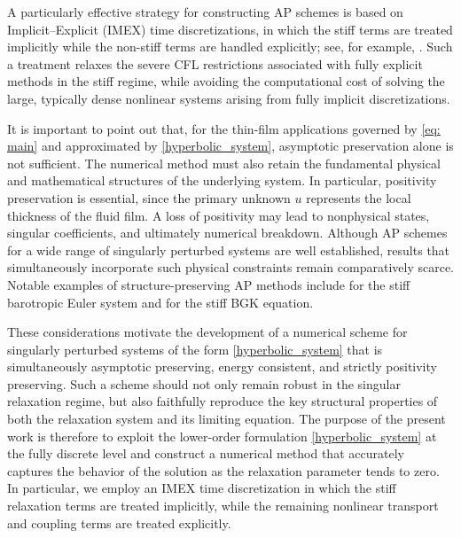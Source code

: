 \documentclass[11pt]{article}
\numberwithin{equation}{section}
\newtheorem{counter example}[theorem]{Counter Example}
\numberwithin{equation}{section}
\numberwithin{equation}{section}
\begin{document}
A particularly effective strategy for constructing AP schemes is based on Implicit--Explicit (IMEX) time discretizations, in which the stiff terms are treated implicitly while the non-stiff terms are handled explicitly; see, for example, \cite{dimarco2018second, BAL+14, BLY17, BRS18, CDK12, DT11, DP13, HJL12, Kle95, NBA+14}. Such a treatment relaxes the severe CFL restrictions associated with fully explicit methods in the stiff regime, while avoiding the computational cost of solving the large, typically dense nonlinear systems arising from fully implicit discretizations.

It is important to point out that, for the thin-film applications governed by \eqref{eq: main} and approximated by \eqref{hyperbolic_system}, asymptotic preservation alone is not sufficient. The numerical method must also retain the fundamental physical and mathematical structures of the underlying system. In particular, positivity preservation is essential, since the primary unknown $u$ represents the local thickness of the fluid film. A loss of positivity may lead to nonphysical states, singular coefficients, and ultimately numerical breakdown. Although AP schemes for a wide range of singularly perturbed systems are well established, results that simultaneously incorporate such physical constraints remain comparatively scarce. Notable examples of structure-preserving AP methods include \cite{AGK23} for the stiff barotropic Euler system and \cite{HSZ18} for the stiff BGK equation.

These considerations motivate the development of a numerical scheme for singularly perturbed systems of the form \eqref{hyperbolic_system} that is simultaneously asymptotic preserving, energy consistent, and strictly positivity preserving. Such a scheme should not only remain robust in the singular relaxation regime, but also faithfully reproduce the key structural properties of both the relaxation system and its limiting equation. The purpose of the present work is therefore to exploit the lower-order formulation \eqref{hyperbolic_system} at the fully discrete level and construct a numerical method that accurately captures the behavior of the solution as the relaxation parameter tends to zero. In particular, we employ an IMEX time discretization in which the stiff relaxation terms are treated implicitly, while the remaining nonlinear transport and coupling terms are treated explicitly.
\end{document}
